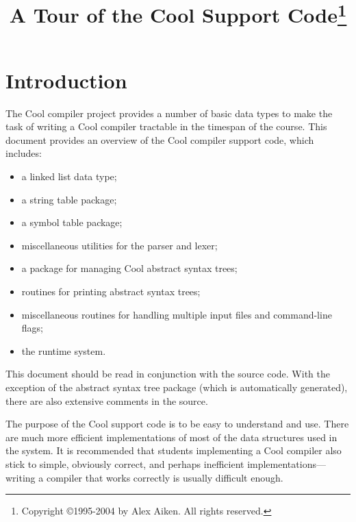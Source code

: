 \documentclass[11pt]{article}
\begin{document}
\title{A Tour of the Cool Support Code\thanks{
Copyright \copyright 1995-2004 by Alex Aiken.
All rights reserved.}}  
\date{ }
\author{ }
\maketitle

\section{Introduction}

The Cool compiler project provides a number of basic data types to
make the task of writing a Cool compiler tractable in the timespan of
the course.  This document provides an overview of the Cool compiler
support code, which includes:

\begin{itemize}

\item a linked list data type;

\item a string table package;

\item a symbol table package;

\item miscellaneous utilities for the parser and lexer; 

\item a package for managing Cool abstract syntax trees;

\item routines for printing abstract syntax trees;

\item miscellaneous routines for handling multiple input files and
	command-line flags;

\item the runtime system.


\end{itemize}

This document should be read in conjunction with the source code.  With
the exception of the abstract syntax tree package (which is automatically
generated), there are also extensive comments in the source. 

The purpose of the Cool support code is 
to be easy to understand and use.  There are much more efficient
implementations of most of the data structures used in the system.  It
is recommended that students implementing a Cool compiler also stick
to simple, obviously correct, and perhaps inefficient
implementations---writing a compiler that works 
correctly is usually difficult enough.
\end{document}
